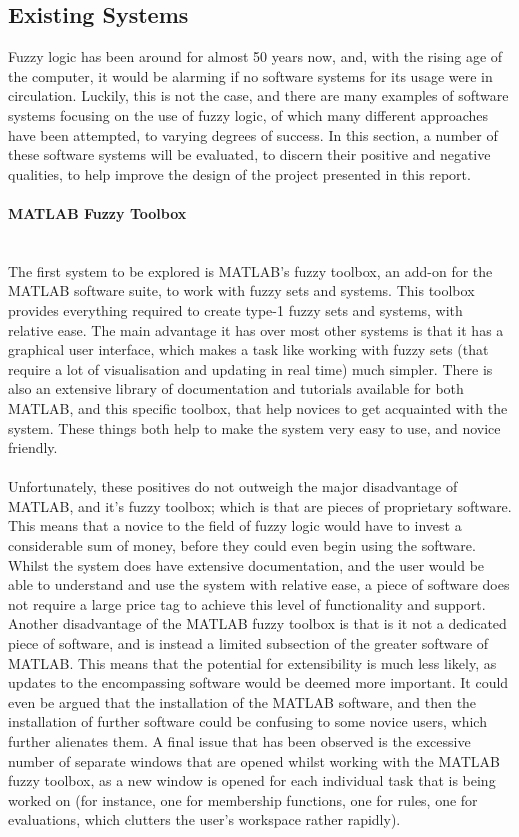 \subsection{Existing Systems}
\label{sec:existing-systems}

Fuzzy logic has been around for almost 50 years now, and, with the rising age of the computer, it would be alarming if no software systems for its usage were in circulation. Luckily, this is not the case, and there are many examples of software systems focusing on the use of fuzzy logic, of which many different approaches have been attempted, to varying degrees of success. In this section, a number of these software systems will be evaluated, to discern their positive and negative qualities, to help improve the design of the project presented in this report. 

\paragraph{MATLAB Fuzzy Toolbox}\ \\
The first system to be explored is MATLAB's fuzzy toolbox, an add-on for the MATLAB software suite, to work with fuzzy sets and systems. This toolbox provides everything required to create type-1 fuzzy sets and systems, with relative ease. The main advantage it has over most other systems is that it has a graphical user interface, which makes a task like working with fuzzy sets (that require a lot of visualisation and updating in real time) much simpler. There is also an extensive library of documentation and tutorials available for both MATLAB, and this specific toolbox, that help novices to get acquainted with the system. These things both help to make the system very easy to use, and novice friendly.\ \\
\ \\
Unfortunately, these positives do not outweigh the major disadvantage of MATLAB, and it's fuzzy toolbox; which is that are pieces of proprietary software. This means that a novice to the field of fuzzy logic would have to invest a considerable sum of money, before they could even begin using the software. Whilst the system does have extensive documentation, and the user would be able to understand and use the system with relative ease, a piece of software does not require a large price tag to achieve this level of functionality and support. Another disadvantage of the MATLAB fuzzy toolbox is that is it not a dedicated piece of software, and is instead a limited subsection of the greater software of MATLAB. This means that the potential for extensibility is much less likely, as updates to the encompassing software would be deemed more important. It could even be argued that the installation of the MATLAB software, and then the installation of further software could be confusing to some novice users, which further alienates them. A final issue that has been observed is the excessive number of separate windows that are opened whilst working with the MATLAB fuzzy toolbox, as a new window is opened for each individual task that is being worked on (for instance, one for membership functions, one for rules, one for evaluations, which clutters the user's workspace rather rapidly).

